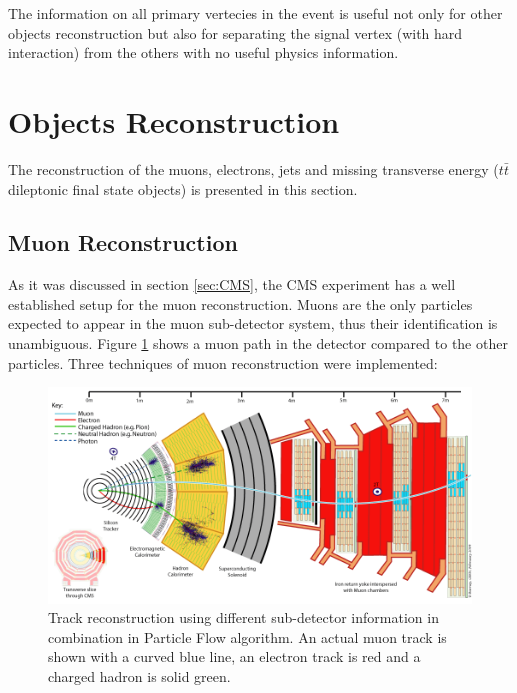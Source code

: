 The information on all primary vertecies in the event is useful not only for other objects reconstruction but also for separating the signal vertex (with hard interaction) 
from the others with no useful physics information.

\section{Objects Reconstruction}

The reconstruction of the muons, electrons, jets and missing transverse energy ($t\bar{t}$ dileptonic final state objects)
is presented in this section.

\subsection{Muon Reconstruction}

As it was discussed in section \ref{sec:CMS}, the CMS experiment has a well established setup for the muon reconstruction.
Muons are the only particles expected to appear in the muon sub-detector system, thus their identification is unambiguous.
Figure \ref{fig:PFmuons} shows a muon path in the detector compared to the other particles.
Three techniques of muon reconstruction were implemented:

\begin{figure}[t]
  \centering
  \includegraphics[width=1.0\textwidth]{04_event_reconstruction/plots/CMS_Slice.png}
  \caption{Track reconstruction using different sub-detector information in combination in Particle Flow algorithm. An actual
  muon track is shown with a curved blue line, an electron track is red and a charged hadron is solid green.}
  \label{fig:PFmuons}
\end{figure}

